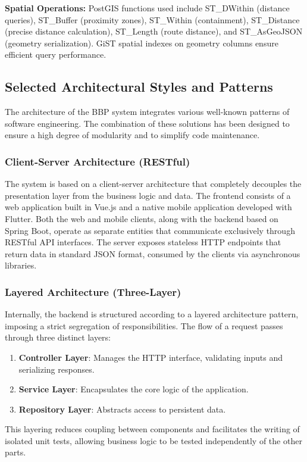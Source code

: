 \textbf{Spatial Operations:}
PostGIS functions used include ST\_DWithin (distance queries), ST\_Buffer (proximity zones), 
ST\_Within (containment), ST\_Distance (precise distance calculation), ST\_Length (route distance), 
and ST\_AsGeoJSON (geometry serialization). GiST spatial indexes on geometry columns ensure efficient query performance.


\subsection{Selected Architectural Styles and Patterns}
The architecture of the BBP system integrates various well-known patterns of software engineering. The combination of these solutions has been designed to ensure a high degree of modularity and to simplify code maintenance.

\subsubsection{Client-Server Architecture (RESTful)}
The system is based on a client-server architecture that completely decouples the presentation layer from the business logic and data. The frontend consists of a web application built in Vue.js and a native mobile application developed with Flutter. Both the web and mobile clients, along with the backend based on Spring Boot, operate as separate entities that communicate exclusively through RESTful API interfaces. The server exposes stateless HTTP endpoints that return data in standard JSON format, consumed by the clients via asynchronous libraries.

\subsubsection{Layered Architecture (Three-Layer)}
Internally, the backend is structured according to a layered architecture pattern, imposing a strict segregation of responsibilities. The flow of a request passes through three distinct layers:
\begin{enumerate}
    \item \textbf{Controller Layer}: Manages the HTTP interface, validating inputs and serializing responses.
    \item \textbf{Service Layer}: Encapsulates the core logic of the application.
    \item \textbf{Repository Layer}: Abstracts access to persistent data.
\end{enumerate}
This layering reduces coupling between components and facilitates the writing of isolated unit tests, allowing business logic to be tested independently of the other parts.

